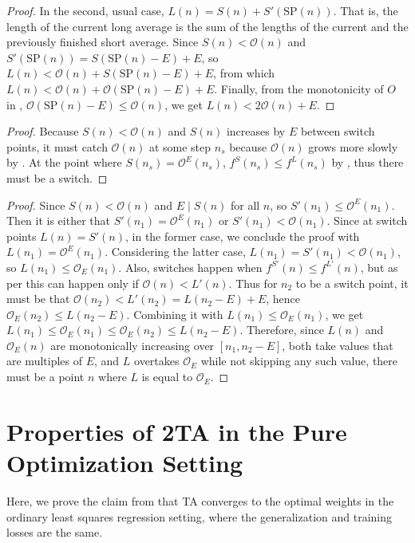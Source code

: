 \documentclass[twocolumn]{article}
\newcommand*{\SP}{\mathrm{SP}}
\newcommand{\divides}{\mathrel{|}}
\newcommand{\OL}{\mathcal{O}}
\newcommand{\tta}{\textlf{2}TA}
\begin{document}
\begin{appendices}
\begin{proof}
In the second, usual case, $L(n) = S(n) + S'\!(\SP(n))$.
That is, the length of the current long average is the sum of the lengths of the current and the previously finished short average.
Since $S(n) < \OL(n)$ and $S'\!(\SP(n)) = S(\SP(n)-E) + E$, so $L(n) < \OL(n) + S(\SP(n)-E) + E$, from which $L(n) < \OL(n) + \OL(\SP(n)-E) + E$.
Finally, from the monotonicity of $O$ in , $\OL(\SP(n)-E) \leq \OL(n)$, we get $L(n) < 2\OL(n) + E$.
\end{proof}

\propinfinite*

\begin{proof}
Because $S(n) < \OL(n)$ and $S(n)$ increases by $E$ between switch points, it must catch $\OL(n)$ at some step $n_s$ because $\OL(n)$ grows more slowly by .
At the point where $S(n_s) = \OL^E(n_s)$, $f^S(n_s) \leq f^L(n_s)$ by , thus there must be a switch.
\end{proof}

\proponce*

\begin{proof}
Since $S(n) < \OL(n)$ and $E \divides S(n)$ for all $n$, so $S'\!(n_1) \leq \OL^E(n_1)$.
Then it is either that $S'\!(n_1) = \OL^E(n_1)$ or $S'\!(n_1) < \OL(n_1)$.
Since at switch points $L(n)=S'\!(n)$, in the former case, we conclude the proof with $L(n_1) = \OL^E(n_1)$.
Considering the latter case, $L(n_1) = S'\!(n_1) < \OL(n_1)$, so $L(n_1) \leq \OL_E(n_1)$.
Also, switches happen when $f^{S'\!\!}(n) \leq f^{L'\!\!}(n)$, but as per  this can happen only if $\OL(n) < L'\!(n)$.
Thus for $n_2$ to be a switch point, it must be that $\OL(n_2) < L'\!(n_2) = L(n_2-E) + E$, hence $\OL_E(n_2) \leq L(n_2-E)$.
Combining it with $L(n_1) \leq \OL_E(n_1)$, we get $L(n_1) \leq \OL_E(n_1) \leq \OL_E(n_2) \leq L(n_2-E)$.
Therefore, since $L(n)$ and $\OL_E(n)$ are monotonically increasing over $[n_1,n_2-E]$, both take values that are multiples of $E$, and $L$ overtakes $\OL_E$ while not skipping any such value, there must be a point $n$ where $L$ is equal to $\OL_E$.
\end{proof}


\section{Properties of 2TA in the Pure Optimization Setting}
\label{sec:properties-of-tta-in-pure-optimization}

Here, we prove the claim from  that \tta{} converges to the optimal weights in the ordinary least squares regression setting, where the generalization and training losses are the same.


\end{appendices}
\end{document}
